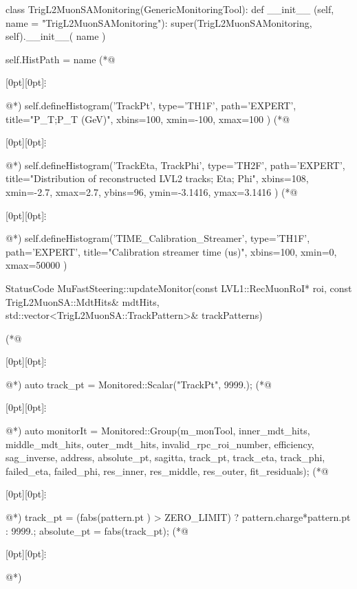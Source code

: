 \begin{python}[caption={Fragment kodu konfiguracji Athena Python~\cite{histogram-declaration}, zawierającego deklarację histogramów przedstawionych na rysunkach~\ref{fig:athena:histogram_TH1},~\ref{fig:athena:histogram_TH1_time}~i~\ref{fig:athena:histogram_TH2}}, label={lst:athena:histogram_declaration}]
class TrigL2MuonSAMonitoring(GenericMonitoringTool):
    def __init__ (self, name = "TrigL2MuonSAMonitoring"):
        super(TrigL2MuonSAMonitoring, self).__init__( name )
    
        self.HistPath = name
(*@\centerline{\raisebox{-1pt}[0pt][0pt]{$\vdots$}}@*)
        self.defineHistogram('TrackPt', type='TH1F', path='EXPERT', title="P_{T};P_{T} (GeV)", xbins=100, xmin=-100, xmax=100 )
(*@\centerline{\raisebox{-1pt}[0pt][0pt]{$\vdots$}}@*)
        self.defineHistogram('TrackEta, TrackPhi', type='TH2F', path='EXPERT', title="Distribution of reconstructed LVL2 tracks; Eta; Phi", xbins=108, xmin=-2.7, xmax=2.7, ybins=96, ymin=-3.1416, ymax=3.1416 )
(*@\centerline{\raisebox{-1pt}[0pt][0pt]{$\vdots$}}@*)
        self.defineHistogram('TIME_Calibration_Streamer', type='TH1F', path='EXPERT', title="Calibration streamer time (us)", xbins=100, xmin=0, xmax=50000 )
\end{python}

\begin{cpp}[caption={Fragment kodu algorytmu~\cite{histogram-fill}, odpowiadającego za wypełnienie histogramu przedstawionego na rysunku~\ref{fig:athena:histogram_TH1}, za pomocą zmiennej monitorowanej `TrackPt`.}, label={lst:athena:track_pt}]
StatusCode MuFastSteering::updateMonitor(const LVL1::RecMuonRoI* roi,
  const TrigL2MuonSA::MdtHits& mdtHits,
  std::vector<TrigL2MuonSA::TrackPattern>& trackPatterns)
{
(*@\centerline{\raisebox{-1pt}[0pt][0pt]{$\vdots$}}@*)
  auto track_pt 	= Monitored::Scalar("TrackPt", 9999.);
(*@\centerline{\raisebox{-1pt}[0pt][0pt]{$\vdots$}}@*)
  auto monitorIt	= Monitored::Group(m_monTool, inner_mdt_hits, middle_mdt_hits, outer_mdt_hits, invalid_rpc_roi_number, efficiency, sag_inverse, address, absolute_pt, sagitta, track_pt, track_eta, track_phi, failed_eta, failed_phi, res_inner, res_middle, res_outer, fit_residuals);
(*@\centerline{\raisebox{-1pt}[0pt][0pt]{$\vdots$}}@*)
  track_pt = (fabs(pattern.pt ) > ZERO_LIMIT) ? pattern.charge*pattern.pt : 9999.;
  absolute_pt = fabs(track_pt);
(*@\centerline{\raisebox{-1pt}[0pt][0pt]{$\vdots$}}@*)
}
\end{cpp}

